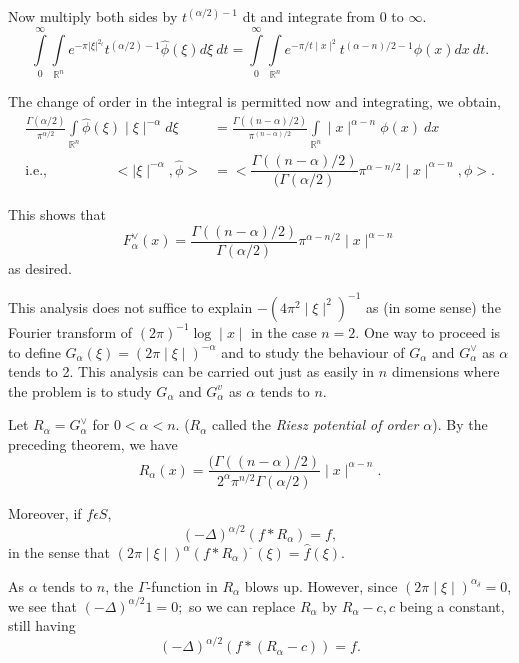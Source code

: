 Now multiply both sides by $t^{(\alpha/2)-1}$ dt and integrate from 0
to $\infty$. 
$$
\int\limits^{\infty}_{0} \int\limits_{\mathbb{R}^n} e^{-\pi | \xi
  |^{2_t}} t^{(\alpha/2)-1} \hat{\phi} (\xi) d\xi ~ dt
=\int\limits^{\infty}_{0} \int\limits_{\mathbb{R}^n} e^{-\pi/t \mid x
  \mid ^2} t^{(\alpha-n)/2-1} \phi (x) dx ~ dt. 
$$

The change of order in the integral is permitted now and integrating,
we obtain, 
\begin{align*}
  \frac{\Gamma(\alpha/2)}{\pi^{\alpha/2}} \int\limits_{\mathbb{R}^n}
  \hat{\phi}(\xi)\mid \xi \mid^{-\alpha} d \xi & =
  \frac{\Gamma((n-\alpha)/2)}{\pi^{(n-\alpha)/2}}
  \int\limits_{\mathbb{R}^n}\mid x \mid^{\alpha-n} \phi (x) ~ dx\\ 
  \text{i.e.,} \hspace{2cm} < \mid \xi \mid^{-\alpha}, \hat{\phi} > 
  & = < \dfrac{\Gamma ((n-\alpha)/2)}{(\Gamma (\alpha/2)} \pi^{\alpha-n/2}
  \mid x \mid ^{\alpha-n}, \phi >. 
\end{align*}

This shows that 
$$
F^{\vee}_{\alpha}(x) = \frac{\Gamma ((n-\alpha)/2)}{\Gamma(\alpha/2)}
\pi^{\alpha-n/2} \mid x \mid^{\alpha-n} 
$$
as desired.

This analysis does not suffice to explain $-(4\pi^2\mid \xi \mid
^2)^{-1}$ as (in some sense) the Fourier transform of $(2\pi)^{-1}
\log \mid x \mid $ in the case $n=2$. One way to proceed is to define
$G_\alpha(\xi) = (2\pi \mid \xi \mid)^{-\alpha} $ and to study the
behaviour of $G_\alpha$ and $G^{\vee}_{\alpha}$ as $\alpha$  tends to
2. This analysis can be carried out just as easily in $n$ dimensions
where the problem is to study $G_\alpha$ and $G^v_\alpha$ as $\alpha$
tends to $n$.

Let $R_\alpha = G^{\vee}_{\alpha}$ for $0< \alpha < n$. ($R_\alpha$
called the \textit{Riesz potential of order $\alpha$}). By the
preceding theorem, we have 
$$
R_\alpha (x) = \frac{(\Gamma((n-\alpha)/2)}{2^{\alpha} \pi^{n/2}\Gamma
  (\alpha/2)} \mid x \mid^{\alpha-n}. 
$$\pageoriginale

Moreover, if $f \epsilon S$,
$$
(-\Delta)^{\alpha/2} (f * R_\alpha)=f,
$$
in the sense that $(2\pi\mid \xi \mid)^\alpha (f * R_\alpha)^{\hat{~}}(\xi) =
\hat{f}(\xi)$. 

As $\alpha$ tends to $n$, the $\Gamma$-function in $R_\alpha$ blows
up. However, since $(2\pi \mid \xi \mid)^{\alpha_\delta}=0$, we see
that $(-\Delta)^{\alpha/2} 1=0;$ so we can replace $R_\alpha$ by
$R_\alpha-c,c$ being a constant, still having 
$$
(-\Delta)^{\alpha/2} (f * (R_\alpha -c)) = f.
$$

